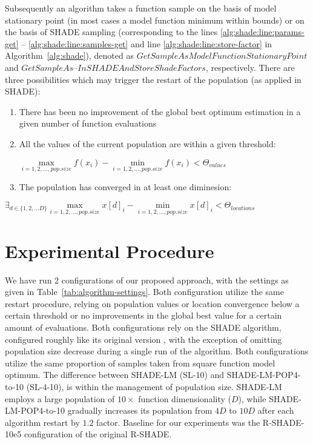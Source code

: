 \documentclass[manuscript]{acmart}
\begin{document}
Subsequently an algorithm takes a function sample on the basis of model
stationary point (in most cases a model function minimum within bounds)
or on the basis of SHADE sampling (corresponding to the lines \ref{alg:shade:line:params-get} -- \ref{alg:shade:line:samples-get} and 
line \ref{alg:shade:line:store-factor} in Algorithm~\ref{alg:shade}), denoted as $GetSampleAsModelFunctionStationaryPoint$ and $GetSampleAs$--$InSHADEAndStoreShadeFactors$, respectively.
%
There are three possibilities which may trigger the restart of the population (as applied in SHADE):
\begin{enumerate}
	\item There has been no improvement of the global best optimum estimation in a given number of function evaluations
	\item All the values of the current population are within a given threshold:
	
	$\max\limits_{i=1,2,\ldots,pop.size}f(x_i) - \min\limits_{i=1,2,\ldots,pop.size}f(x_i) < \Theta_{values}$
	\item The population has converged in at least one diminesion:
\end{enumerate}
$\exists_{d \in \lbrace 1,2,\ldots D \rbrace} \max\limits_{i=1,2,\ldots,pop.size}x[d]_i - \min\limits_{i=1,2,\ldots,pop.size}x[d]_i < \Theta_{locations}$


\section{Experimental Procedure}

We have run 2 configurations of our proposed approach,
with the settings as given in Table~\ref{tab:algorithm-settings}.
Both configuration utilize the same restart procedure,
relying on population values or location convergence
below a certain threshold or no improvements in the global best
value for a certain amount of evaluations.
Both configurations rely on the SHADE algorithm,
configured roughly like its original version \cite{Tanabe2014},
with the exception of omitting population size decrease during
a single run of the algorithm.
Both configurations utilize the same proportion of samples
taken from square function model optimum.
The difference between SHADE-LM (SL-10) and SHADE-LM-POP4-to-10 (SL-4-10),
is within the management of population size.
SHADE-LM employs a large population of $10 \times$ function dimensionality ($D$),
while SHADE-LM-POP4-to-10 gradually increases its population from
$4D$ to $10D$ after each algorithm restart
by $1.2$ factor.
Baseline for our experiments was the R-SHADE-10e5 configuration of the original R-SHADE\cite{Tanabe2014}.
\end{document}
